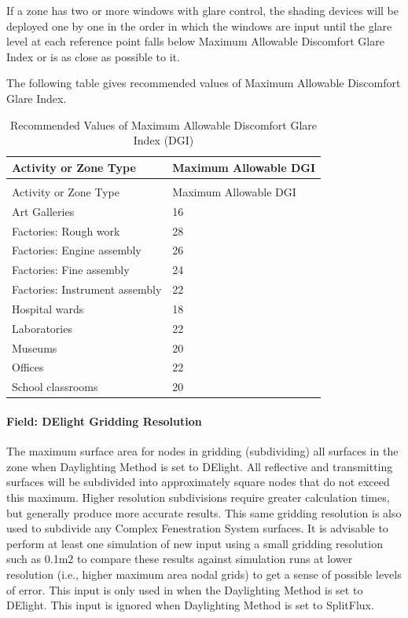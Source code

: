 If a zone has two or more windows with glare control, the shading devices will be deployed one by one in the order in which the windows are input until the glare level at each reference point falls below Maximum Allowable Discomfort Glare Index or is as close as possible to it.

The following table gives recommended values of Maximum Allowable Discomfort Glare Index.

\begin{longtable}[c]{@{}ll@{}}
\caption{Recommended Values of Maximum Allowable Discomfort Glare Index (DGI) \label{table:recommended-values-discomfort-glare-index}} \tabularnewline
\toprule
Activity or Zone Type & Maximum Allowable DGI \tabularnewline
\midrule
\endfirsthead

\caption[]{Recommended Values of Maximum Allowable Discomfort Glare Index (DGI)} \tabularnewline
\toprule
Activity or Zone Type & Maximum Allowable DGI \tabularnewline
\midrule
\endhead

Art Galleries & 16 \tabularnewline
Factories: Rough work & 28 \tabularnewline
Factories: Engine assembly & 26 \tabularnewline
Factories: Fine assembly & 24 \tabularnewline
Factories: Instrument assembly & 22 \tabularnewline
Hospital wards & 18 \tabularnewline
Laboratories & 22 \tabularnewline
Museums & 20 \tabularnewline
Offices & 22 \tabularnewline
School classrooms & 20 \tabularnewline
\bottomrule
\end{longtable}

\paragraph{Field: DElight Gridding Resolution}\label{field-gridding-resolution}

The maximum surface area for nodes in gridding (subdividing) all surfaces in the zone when Daylighting Method is set to DElight. All reflective and transmitting surfaces will be subdivided into approximately square nodes that do not exceed this maximum. Higher resolution subdivisions require greater calculation times, but generally produce more accurate results. This same gridding resolution is also used to subdivide any Complex Fenestration System surfaces. It is advisable to perform at least one simulation of new input using a small gridding resolution such as 0.1m2 to compare these results against simulation runs at lower resolution (i.e., higher maximum area nodal grids) to get a sense of possible levels of error. This input is only used in when the Daylighting Method is set to DElight. This input is ignored when Daylighting Method is set to SplitFlux.

